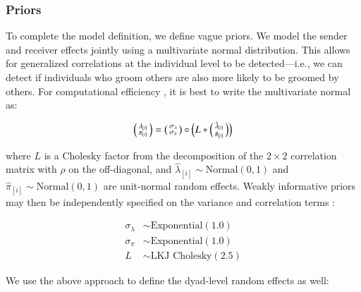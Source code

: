 \documentclass[Afour,sageh,times]{sagej}
\begin{document}
\subsubsection{Priors}
To complete the model definition, we define vague priors. We model the sender and receiver effects jointly using a multivariate normal distribution. This allows for generalized correlations at the individual level to be detected---i.e., we can detect if individuals who groom others are also more likely to be groomed by others. For computational efficiency \citep{stan2021, lewandowski2009generating}, it is best to write the multivariate normal as:
\begin{ceqn}
\begin{equation}
 \begin{psmallmatrix}
\lambda_{[i]} \\
\pi_{[i]}
\end{psmallmatrix}
 =  \begin{psmallmatrix}
\sigma_\lambda\\
\sigma_\pi
\end{psmallmatrix} \circ \left(L* \begin{psmallmatrix}
\hat\lambda_{[i]} \\
\hat\pi_{[i]}
\end{psmallmatrix}\right)
\end{equation}
\end{ceqn}
where $L$ is a Cholesky factor from the decomposition of the $2 \times 2$ correlation matrix with $\rho$ on the off-diagonal, and $\hat\lambda_{[i]}\sim \text {Normal}(0,1)$ and $\hat\pi_{[i]}\sim \text {Normal}(0,1)$ are unit-normal random effects. 
Weakly informative priors may then be independently specified on the variance and correlation terms \citep{lewandowski2009generating}:

\begin{ceqn}
\begin{align}
\sigma_\lambda &\sim \text {Exponential}(1.0)\label{bob69}\\
\sigma_\pi &\sim \text {Exponential}(1.0)\label{bob420}\\
L &\sim \text {LKJ Cholesky}(2.5)\label{bob420L}
\end{align}
\end{ceqn}

We use the above approach to define the dyad-level random effects as well:
\end{document}
